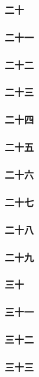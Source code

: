\subsubsection*{二十}
\subsubsection*{二十一}
\subsubsection*{二十二}
\subsubsection*{二十三}
\subsubsection*{二十四}
\subsubsection*{二十五}
\subsubsection*{二十六}
\subsubsection*{二十七}
\subsubsection*{二十八}
\subsubsection*{二十九}
\subsubsection*{三十}
\subsubsection*{三十一}
\subsubsection*{三十二}
\subsubsection*{三十三}







